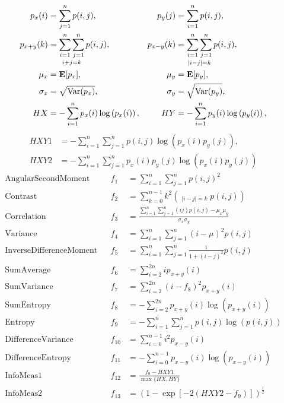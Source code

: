 \begin{align*}
p_x(i) &= \sum_{j=1}^{n} p(i,j), & p_y(j) &= \sum_{i=1}^{n} p(i,j), \\
p_{x+y}(k) &= \mathop{\sum_{i=1}^{n}\sum_{j=1}^{n}}_{i+j=k} p(i,j), &
  p_{x-y}(k) &= \mathop{\sum_{i=1}^{n}\sum_{j=1}^{n}}_{\lvert i-j\rvert=k} p(i,j), \\
  \mu_x &= \operatorname{\mathbf{E}}[p_x], & \mu_y &= \operatorname{\mathbf{E}}[p_y], \\
  \sigma_x &= \sqrt{\operatorname{Var}(p_x)}, & \sigma_y &= \sqrt{\operatorname{Var}(p_y)}, \\
  HX &= -\sum_{i=1}^{n} p_x(i) \log\left(p_x(i)\right), &
  HY &= -\sum_{i=1}^{n} p_y(i) \log\left(p_y(i)\right),
\end{align*}
\begin{align*}
  HXY1 &= -\sum_{i=1}^{n} \sum_{j=1}^{n} p(i,j) \log\left(p_x(i)p_y(j)\right), \\
  HXY2 &= -\sum_{i=1}^{n} \sum_{j=1}^{n} p_x(i)p_y(j) \log\left(p_x(i)p_y(j)\right)
\end{align*}
\begin{align}
\text{AngularSecondMoment} & &
  f_1 &= \sum_{i=1}^n \sum_{j=1}^n p(i,j)^2 \\
\text{Contrast} & &
  f_2 &= \sum_{k=0}^{n-1} k^2 \left(\mathop{\sum_{i=1}^{n}\sum_{j=1}^{n}}_{\lvert i-j\rvert=k} p(i,j)\right) \\
\text{Correlation} & &
  f_3 &= \frac{\sum_{i=1}^n \sum_{j=1}^n (ij) p(i,j)-\mu_x\mu_y}{\sigma_x\sigma_y}\\
\text{Variance} & &
  f_4 &= \sum_{i=1}^n \sum_{j=1}^n (i-\mu)^2 p(i,j)\\
\text{InverseDifferenceMoment} & &
  f_5 &= \sum_{i=1}^n \sum_{j=1}^n \frac{1}{1+(i-j)^2} p(i,j)\\
\text{SumAverage} & &
  f_6 &= \sum_{i=2}^{2n} i p_{x+y}(i)\\
\text{SumVariance} & &
  f_7 &= \sum_{i=2}^{2n} (i-f_8)^2 p_{x+y}(i)\\
\text{SumEntropy} & &
  f_8 &= -\sum_{i=2}^{2n} p_{x+y}(i) \log\left(p_{x+y}(i)\right)\\
\text{Entropy} & &
  f_9 &= -\sum_{i=1}^n \sum_{j=1}^n p(i,j) \log\left(p(i,j)\right)\\
\text{DifferenceVariance} & &
  f_{10} &= \sum_{i=0}^{n-1} i^2 p_{x-y}(i)\\
\text{DifferenceEntropy} & &
  f_{11} &= -\sum_{i=0}^{n-1} p_{x-y}(i) \log\left(p_{x-y}(i)\right)\\
\text{InfoMeas1} & &
  f_{12} &= \frac{f_9-HXY1}{\max\{HX,HY\}}\\
\text{InfoMeas2} & &
  f_{13} &= \left(1-\exp\left[-2(HXY2-f_9)\right]\right)^{\frac{1}{2}}
\end{align}

